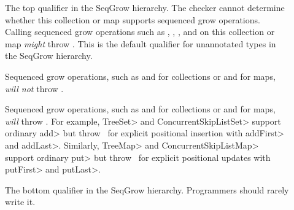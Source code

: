 \begin{description}
\item[]
The top qualifier in the SeqGrow hierarchy.
The checker cannot determine whether this collection or map supports sequenced grow
operations.
Calling sequenced grow operations such as , ,
, and  on this collection or map \emph{might}
throw \UnsupportedOperationException.
This is the default qualifier for unannotated types in the
SeqGrow hierarchy.

\item[]
Sequenced grow operations, such as  and  for
collections or  and  for maps, \emph{will not}
throw \UnsupportedOperationException.

\item[]
Sequenced grow operations, such as  and  for
collections or  and  for maps, \emph{will}
throw \UnsupportedOperationException.
For example, \<TreeSet> and \<ConcurrentSkipListSet> support ordinary
\<add> but throw \UnsupportedOperationException\ for explicit positional
insertion with \<addFirst> and \<addLast>.
Similarly, \<TreeMap> and \<ConcurrentSkipListMap> support ordinary \<put>
but throw \UnsupportedOperationException\ for explicit positional updates
with \<putFirst> and \<putLast>.

\item[]
The bottom qualifier in the SeqGrow hierarchy.  Programmers should rarely write it.
\end{description}


